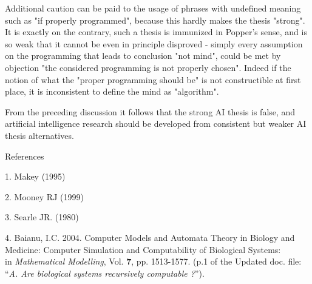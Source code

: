\documentclass[12pt]{article}
\begin{document}
Additional caution can be paid to the usage of phrases with undefined meaning such as "if properly programmed", because this hardly makes the thesis "strong". It is exactly on the contrary, such a thesis is immunized in Popper's sense, and is so weak that it cannot be even in principle disproved - simply every assumption on the programming that leads to conclusion "not mind", could be met by objection "the considered programming is not properly chosen". Indeed if the notion of what the "proper programming should be" is not constructible at first place, it is inconsistent to define the mind as "algorithm".

From the preceding discussion it follows that the strong AI thesis is false, and artificial intelligence research should be developed from consistent but weaker AI thesis alternatives.

References

1. Makey (1995) 

2. Mooney RJ (1999) 

3. Searle JR. (1980) 

4. Baianu, I.C. 2004. Computer Models and Automata Theory in Biology and Medicine: Computer Simulation and 
Computability of Biological Systems:                           
\\
in \emph{Mathematical Modelling}, Vol. {\bf 7}, pp. 1513-1577. (p.1 of the Updated doc. file: ``{\em A. Are biological systems recursively computable ?}''). 
\end{document}
